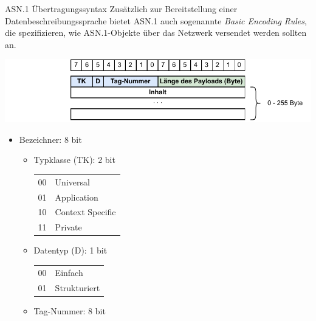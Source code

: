 \begin{defi}{ASN.1 Übertragungssyntax}
    Zusätzlich zur Bereitstellung einer Datenbeschreibungssprache bietet ASN.1 auch sogenannte \emph{Basic Encoding Rules}, die spezifizieren, wie ASN.1-Objekte über das Netzwerk versendet werden sollten an.

    \includegraphics[width=\textwidth]{includes/figures/defi_asn1.pdf}

    \begin{itemize}
        \item Bezeichner: 8 bit

              \begin{itemize}
                  \item Typklasse (TK): 2 bit

                        \begin{tabular}{T|l}
                            00 & Universal        \\
                            01 & Application      \\
                            10 & Context Specific \\
                            11 & Private
                        \end{tabular}
                  \item Datentyp (D): 1 bit

                        \begin{tabular}{T|l}
                            00 & Einfach      \\
                            01 & Strukturiert
                        \end{tabular}
                  \item Tag-Nummer: 8 bit


\end{itemize}
\end{itemize}
\end{defi}

